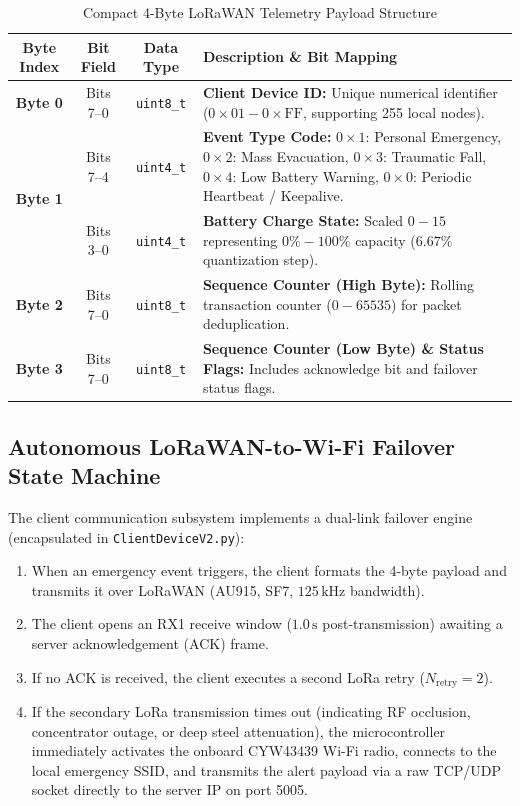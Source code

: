 \begin{table}[htbp]
    \centering
    \caption{Compact 4-Byte LoRaWAN Telemetry Payload Structure}
    \label{tab:lora_payload}
    \begin{tabularx}{\textwidth}{c c c X}
        \toprule
        \textbf{Byte Index} & \textbf{Bit Field} & \textbf{Data Type} & \textbf{Description \& Bit Mapping} \\
        \midrule
        \textbf{Byte 0} & Bits 7--0 & \texttt{uint8\_t} & \textbf{Client Device ID:} Unique numerical identifier ($0\times 01 - 0\times\text{FF}$, supporting 255 local nodes). \\
        \midrule
        \multirow{2}{*}{\textbf{Byte 1}} & Bits 7--4 & \texttt{uint4\_t} & \textbf{Event Type Code:} \newline $0\times 1$: Personal Emergency, $0\times 2$: Mass Evacuation, \newline $0\times 3$: Traumatic Fall, $0\times 4$: Low Battery Warning, \newline $0\times 0$: Periodic Heartbeat / Keepalive. \\
        \cmidrule{2-4}
        & Bits 3--0 & \texttt{uint4\_t} & \textbf{Battery Charge State:} Scaled $0-15$ representing $0\% - 100\%$ capacity ($6.67\%$ quantization step). \\
        \midrule
        \textbf{Byte 2} & Bits 7--0 & \texttt{uint8\_t} & \textbf{Sequence Counter (High Byte):} Rolling transaction counter ($0-65535$) for packet deduplication. \\
        \midrule
        \textbf{Byte 3} & Bits 7--0 & \texttt{uint8\_t} & \textbf{Sequence Counter (Low Byte) \& Status Flags:} Includes acknowledge bit and failover status flags. \\
        \bottomrule
    \end{tabularx}
\end{table}

\subsection{Autonomous LoRaWAN-to-Wi-Fi Failover State Machine}
The client communication subsystem implements a dual-link failover engine (encapsulated in \texttt{ClientDeviceV2.py}):
\begin{enumerate}
    \item When an emergency event triggers, the client formats the 4-byte payload and transmits it over LoRaWAN (AU915, SF7, $125\,\text{kHz}$ bandwidth).
    \item The client opens an RX1 receive window ($1.0\,\text{s}$ post-transmission) awaiting a server acknowledgement (ACK) frame.
    \item If no ACK is received, the client executes a second LoRa retry ($N_{\text{retry}} = 2$).
    \item If the secondary LoRa transmission times out (indicating RF occlusion, concentrator outage, or deep steel attenuation), the microcontroller immediately activates the onboard CYW43439 Wi-Fi radio, connects to the local emergency SSID, and transmits the alert payload via a raw TCP/UDP socket directly to the server IP on port 5005.
\end{enumerate}

